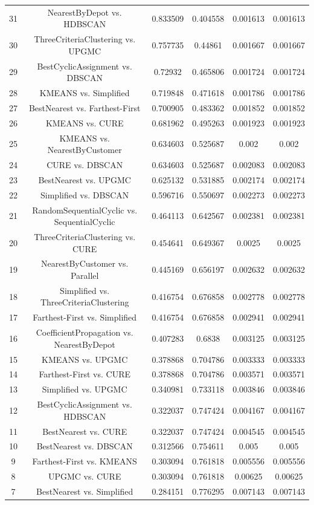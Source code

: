 \documentclass[a4paper,10pt]{article}
\begin{document}
\begin{landscape}
\begin{table}[!htp]
\begin{tabular}{cccccc}
31&NearestByDepot vs. HDBSCAN&0.833509&0.404558&0.001613&0.001613\\
30&ThreeCriteriaClustering vs. UPGMC&0.757735&0.44861&0.001667&0.001667\\
29&BestCyclicAssignment vs. DBSCAN&0.72932&0.465806&0.001724&0.001724\\
28&KMEANS vs. Simplified&0.719848&0.471618&0.001786&0.001786\\
27&BestNearest vs. Farthest-First&0.700905&0.483362&0.001852&0.001852\\
26&KMEANS vs. CURE&0.681962&0.495263&0.001923&0.001923\\
25&KMEANS vs. NearestByCustomer&0.634603&0.525687&0.002&0.002\\
24&CURE vs. DBSCAN&0.634603&0.525687&0.002083&0.002083\\
23&BestNearest vs. UPGMC&0.625132&0.531885&0.002174&0.002174\\
22&Simplified vs. DBSCAN&0.596716&0.550697&0.002273&0.002273\\
21&RandomSequentialCyclic vs. SequentialCyclic&0.464113&0.642567&0.002381&0.002381\\
20&ThreeCriteriaClustering vs. CURE&0.454641&0.649367&0.0025&0.0025\\
19&NearestByCustomer vs. Parallel&0.445169&0.656197&0.002632&0.002632\\
18&Simplified vs. ThreeCriteriaClustering&0.416754&0.676858&0.002778&0.002778\\
17&Farthest-First vs. Simplified&0.416754&0.676858&0.002941&0.002941\\
16&CoefficientPropagation vs. NearestByDepot&0.407283&0.6838&0.003125&0.003125\\
15&KMEANS vs. UPGMC&0.378868&0.704786&0.003333&0.003333\\
14&Farthest-First vs. CURE&0.378868&0.704786&0.003571&0.003571\\
13&Simplified vs. UPGMC&0.340981&0.733118&0.003846&0.003846\\
12&BestCyclicAssignment vs. HDBSCAN&0.322037&0.747424&0.004167&0.004167\\
11&BestNearest vs. CURE&0.322037&0.747424&0.004545&0.004545\\
10&BestNearest vs. DBSCAN&0.312566&0.754611&0.005&0.005\\
9&Farthest-First vs. KMEANS&0.303094&0.761818&0.005556&0.005556\\
8&UPGMC vs. CURE&0.303094&0.761818&0.00625&0.00625\\
7&BestNearest vs. Simplified&0.284151&0.776295&0.007143&0.007143\\

\end{tabular}
\end{table}
\end{landscape}
\end{document}
